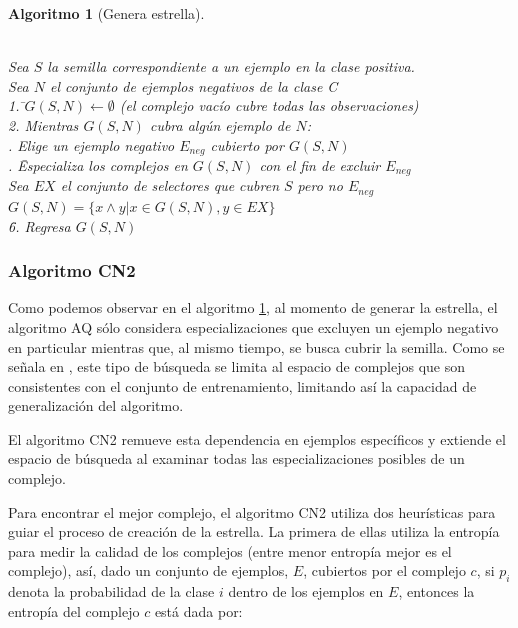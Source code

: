 \documentclass[12pt]{report}
\theoremstyle{break}
\theoremstyle{break}
\newtheorem{algoritmo}{Algoritmo}[chapter]
\begin{document}
\begin{algoritmo}[Genera estrella]
\begin{tabbing}
\\Sea $S$ la semilla correspondiente a un ejemplo en la clase positiva.
\\Sea $N$ el conjunto de ejemplos negativos de la clase C\\
1. \=$G(S,N)\leftarrow \emptyset$ (el complejo vacío cubre todas las observaciones) \\
2. Mientras $G(S,N)$ cubra algún ejemplo de $N$:\\
 . Elige un ejemplo negativo $E_{neg}$ cubierto por $G(S,N)$\\
 . \= Especializa los complejos en $G(S,N)$ con el fin de excluir $E_{neg}$\\
 \> Sea $EX$ el conjunto de selectores que cubren $S$ pero no $E_{neg}$ \\
 \> $G(S,N)=\{x \wedge y \vert x \in G(S,N), y \in EX \}$\\
\=6. Regresa $G(S,N)$
\end{tabbing}
\label{algo:AQ genera estrella}
\end{algoritmo}

\subsubsection{Algoritmo CN2}
\label{subseccion:algoritmo cn2}
Como podemos observar en el algoritmo \ref{algo:AQ genera estrella}, al momento de generar la estrella, el algoritmo AQ sólo considera especializaciones que excluyen un ejemplo negativo en particular mientras que, al mismo tiempo, se busca cubrir la semilla. Como se señala en \cite{CN2-Clark1989}, este tipo de búsqueda se limita al espacio de complejos que son consistentes con el conjunto de entrenamiento, limitando así la capacidad de generalización del algoritmo.

El algoritmo CN2 remueve esta dependencia en ejemplos específicos y extiende el espacio de búsqueda al examinar todas las especializaciones posibles de un complejo.

Para encontrar el mejor complejo, el algoritmo CN2 utiliza dos heurísticas para guiar el proceso de creación de la estrella. La primera de ellas utiliza la entropía para medir la calidad de los complejos (entre menor entropía mejor es el complejo), así, dado un conjunto de ejemplos, $E$, cubiertos por el complejo $c$, si $p_i$ denota la probabilidad de la clase $i$ dentro de los ejemplos en $E$, entonces la entropía del complejo $c$ está dada por:
\end{document}
